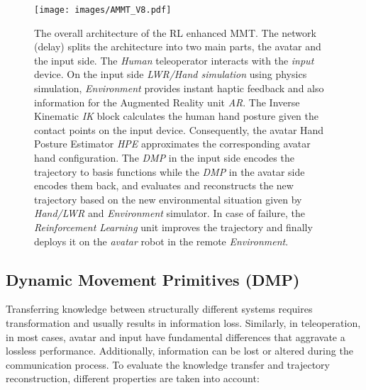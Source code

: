 \documentclass[letterpaper, 10 pt, conference]{ieeeconf}  %
\begin{document}
\begin{figure*}%

\centering
\texttt{[image: images/AMMT\_V8.pdf]}

    \caption[The proposed architecture.]{The overall architecture of the RL enhanced MMT. The network (delay) splits the architecture into two main parts, the avatar and the input side. The \textit{Human} teleoperator interacts with the \textit{input} device. On the input side \textit{LWR/Hand simulation} using physics simulation, \textit{Environment} provides instant haptic feedback and also information for the Augmented Reality unit \textit{AR}. The Inverse Kinematic \textit{IK} block calculates the human hand posture given the contact points on the input device. Consequently, the avatar Hand Posture Estimator \textit{HPE} approximates the corresponding avatar hand configuration. The \textit{DMP} in the input side encodes the trajectory to basis functions while the \textit{DMP} in the avatar side encodes them back, and evaluates and reconstructs the new trajectory based on the new environmental situation given by \textit{Hand/LWR} and \textit{Environment} simulator. In case of failure, the \textit{Reinforcement Learning} unit improves the trajectory and finally deploys it on the \textit{avatar} robot in the remote \textit{Environment}. }
    \label{fig:ProposedArchitecture}
    \vspace{-6mm}
\end{figure*}


\subsection{Dynamic Movement Primitives (DMP)}
\noindent
Transferring knowledge between structurally different systems requires transformation and usually results in information loss. Similarly, in teleoperation, in most cases, avatar and input have fundamental differences that aggravate a lossless performance. Additionally, information can be lost or altered during the communication process. To evaluate the knowledge transfer and trajectory reconstruction, different properties are taken into account:
 
\end{document}
